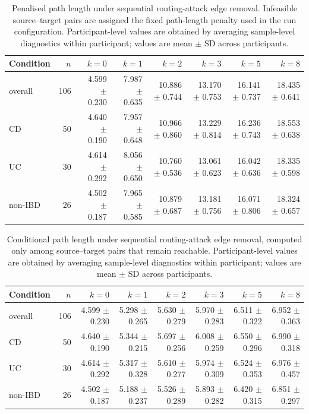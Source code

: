 \begin{table}[ht]
\centering
\caption{Penalised path length under sequential routing-attack edge removal. Infeasible source--target pairs are assigned the fixed path-length penalty used in the run configuration. Participant-level values are obtained by averaging sample-level diagnostics within participant; values are mean $\pm$ SD across participants.}
\label{tab:sequential_attack_penalized_path_length}
\begin{tabular}{lrrrrrrr}
\toprule
Condition & $n$ & $k=0$ & $k=1$ & $k=2$ & $k=3$ & $k=5$ & $k=8$ \\
\midrule
overall & 106 & 4.599 $\pm$ 0.230 & 7.987 $\pm$ 0.635 & 10.886 $\pm$ 0.744 & 13.170 $\pm$ 0.753 & 16.141 $\pm$ 0.737 & 18.435 $\pm$ 0.641 \\
CD & 50 & 4.640 $\pm$ 0.190 & 7.957 $\pm$ 0.648 & 10.966 $\pm$ 0.860 & 13.229 $\pm$ 0.814 & 16.236 $\pm$ 0.743 & 18.553 $\pm$ 0.638 \\
UC & 30 & 4.614 $\pm$ 0.292 & 8.056 $\pm$ 0.650 & 10.760 $\pm$ 0.536 & 13.061 $\pm$ 0.623 & 16.042 $\pm$ 0.636 & 18.335 $\pm$ 0.598 \\
non-IBD & 26 & 4.502 $\pm$ 0.187 & 7.965 $\pm$ 0.585 & 10.879 $\pm$ 0.687 & 13.181 $\pm$ 0.756 & 16.071 $\pm$ 0.806 & 18.324 $\pm$ 0.657 \\
\bottomrule
\end{tabular}
\end{table}


\begin{table}[ht]
\centering
\caption{Conditional path length under sequential routing-attack edge removal, computed only among source--target pairs that remain reachable. Participant-level values are obtained by averaging sample-level diagnostics within participant; values are mean $\pm$ SD across participants.}
\label{tab:sequential_attack_finite_path_length}
\begin{tabular}{lrrrrrrr}
\toprule
Condition & $n$ & $k=0$ & $k=1$ & $k=2$ & $k=3$ & $k=5$ & $k=8$ \\
\midrule
overall & 106 & 4.599 $\pm$ 0.230 & 5.298 $\pm$ 0.265 & 5.630 $\pm$ 0.279 & 5.970 $\pm$ 0.283 & 6.511 $\pm$ 0.322 & 6.952 $\pm$ 0.363 \\
CD & 50 & 4.640 $\pm$ 0.190 & 5.344 $\pm$ 0.215 & 5.697 $\pm$ 0.256 & 6.008 $\pm$ 0.259 & 6.550 $\pm$ 0.296 & 6.990 $\pm$ 0.318 \\
UC & 30 & 4.614 $\pm$ 0.292 & 5.317 $\pm$ 0.328 & 5.610 $\pm$ 0.277 & 5.974 $\pm$ 0.309 & 6.524 $\pm$ 0.353 & 6.976 $\pm$ 0.457 \\
non-IBD & 26 & 4.502 $\pm$ 0.187 & 5.188 $\pm$ 0.237 & 5.526 $\pm$ 0.289 & 5.893 $\pm$ 0.282 & 6.420 $\pm$ 0.315 & 6.851 $\pm$ 0.297 \\
\bottomrule
\end{tabular}
\end{table}

